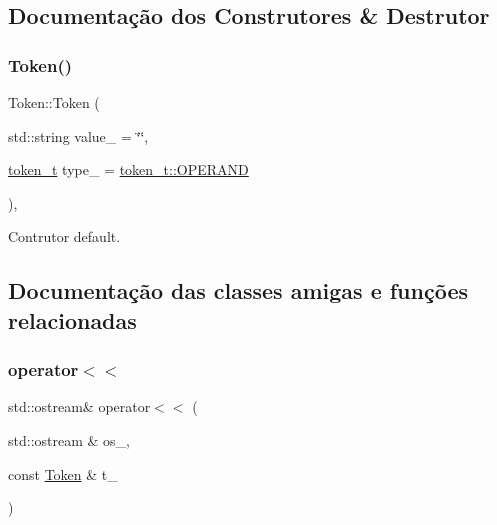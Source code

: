 \subsection{Documentação dos Construtores \& Destrutor}
\mbox{\label{structToken_a2b65ec748189e36df9bced6a12b2f46f}} 
\subsubsection{\texorpdfstring{Token()}{Token()}}
{\footnotesize\ttfamily Token\+::\+Token (\begin{DoxyParamCaption}\item[{std\+::string}]{value\+\_\+ = {\ttfamily \char`\"{}\char`\"{}},  }\item[{\hyperlink{structToken_a0c0bd3a78407f44bc1fd21a9da6bd85b}{token\+\_\+t}}]{type\+\_\+ = {\ttfamily \hyperlink{structToken_a0c0bd3a78407f44bc1fd21a9da6bd85ba11f3de9b2b548c31805cf34d512ee177}{token\+\_\+t\+::\+O\+P\+E\+R\+A\+ND}} }\end{DoxyParamCaption})\hspace{0.3cm}{\ttfamily [inline]}, {\ttfamily [explicit]}}



Contrutor default. 



\subsection{Documentação das classes amigas e funções relacionadas}
\mbox{\label{structToken_a065608b70f9e8c375cf12cc7fc363dcd}} 
\subsubsection{\texorpdfstring{operator$<$$<$}{operator<<}}
{\footnotesize\ttfamily std\+::ostream\& operator$<$$<$ (\begin{DoxyParamCaption}\item[{std\+::ostream \&}]{os\+\_\+,  }\item[{const \hyperlink{structToken}{Token} \&}]{t\+\_\+ }\end{DoxyParamCaption})\hspace{0.3cm}{\ttfamily [friend]}}



